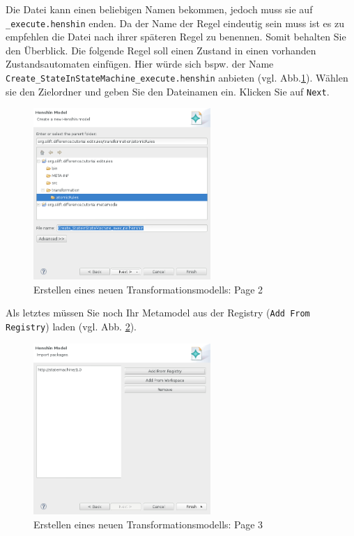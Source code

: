 \documentclass[a4paper]{scrartcl}
\begin{document}
Die Datei kann einen beliebigen Namen bekommen, jedoch muss sie auf \texttt{\_execute.henshin} enden.
Da der Name der Regel eindeutig sein muss ist es zu empfehlen die Datei nach ihrer späteren Regel zu benennen. Somit behalten Sie den Überblick.
Die folgende Regel soll einen Zustand in einen vorhanden Zustandsautomaten einfügen. Hier würde sich bspw. der Name \texttt{Create\_StateInStateMachine\_execute.henshin} anbieten (vgl. Abb.\ref{silift-create_henshin_model_page02}).
Wählen sie den Zielordner und geben Sie den Dateinamen ein.
Klicken Sie auf \texttt{Next}.

\begin{figure}[H]
\centering
\includegraphics[width=0.6\textwidth]{graphics/silift-create_henshin_model_page02.png}
\caption{Erstellen eines neuen Transformationsmodells: Page 2}
\label{silift-create_henshin_model_page02}
\end{figure}

Als letztes müssen Sie noch Ihr Metamodel aus der Registry (\texttt{Add From Registry}) laden (vgl. Abb. \ref{silift-create_henshin_model_page03}).

\begin{figure}[H]
\centering
\includegraphics[width=0.6\textwidth]{graphics/silift-create_henshin_model_page03.png}
\caption{Erstellen eines neuen Transformationsmodells: Page 3}
\label{silift-create_henshin_model_page03}
\end{figure}
\end{document}
